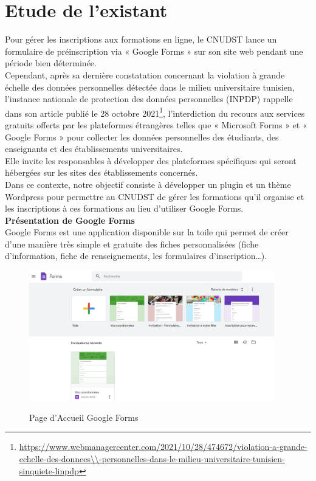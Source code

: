 	

\section{Etude de l’existant } 
Pour gérer les inscriptions aux formations en ligne, le CNUDST lance un formulaire de préinscription via « Google Forms » sur son site web pendant une période bien déterminée.\\
Cependant,  après sa dernière constatation concernant la violation à grande échelle des données personnelles détectée dans le milieu universitaire tunisien, l’instance nationale de protection des données personnelles (INPDP) rappelle dans son article publié le 28 octobre 2021\footnote{\url{https://www.webmanagercenter.com/2021/10/28/474672/violation-a-grande-echelle-des-donnees\\-personnelles-dans-le-milieu-universitaire-tunisien-sinquiete-linpdp}}, l’interdiction du recours aux services gratuits offerts par les plateformes étrangères telles que « Microsoft Forms » et « Google Forms » pour collecter les données personnelles des étudiants, des enseignants et des établissements universitaires.\\Elle invite les responsables à développer des plateformes spécifiques qui seront hébergées sur les sites des établissements concernés.\\Dans ce contexte, notre objectif consiste à développer un plugin et un thème Wordpress pour permettre au CNUDST de gérer les formations qu’il organise et les inscriptions à ces formations au lieu d’utiliser Google Forms.\\
\textbf{Présentation de Google Forms }\\
Google Forms est une application disponible sur la toile qui permet de créer d’une manière très simple et gratuite des fiches personnalisées (fiche d’information, fiche de renseignements, les formulaires d’inscription…).
\begin{figure}[!h]
	\centering
	{\includegraphics[width=0.95\textwidth]{D) IMAGES/for1.png}}
	\caption{Page d'Accueil Google Forms}
	\label{Org}
\end{figure}
